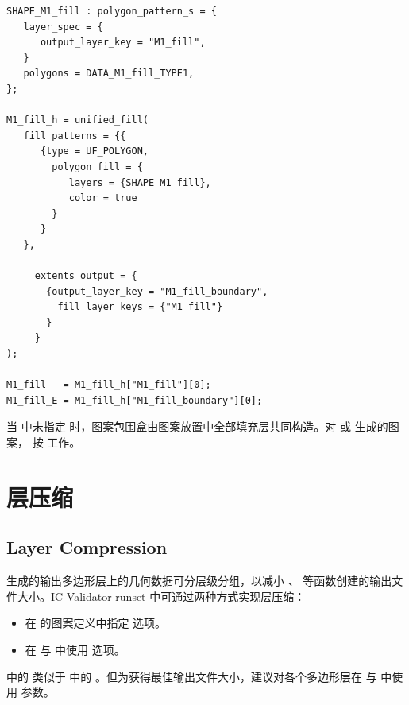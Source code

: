 \begin{lstlisting}[style=pxl,caption={使用 extents\_output 选项},label={ex:uf-extents}]
SHAPE_M1_fill : polygon_pattern_s = {
   layer_spec = {
      output_layer_key = "M1_fill",
   }
   polygons = DATA_M1_fill_TYPE1,
};

M1_fill_h = unified_fill(
   fill_patterns = {{
      {type = UF_POLYGON,
        polygon_fill = {
           layers = {SHAPE_M1_fill},
           color = true
        }
      }
   },

     extents_output = {
       {output_layer_key = "M1_fill_boundary",
         fill_layer_keys = {"M1_fill"}
       }
     }
);

M1_fill   = M1_fill_h["M1_fill"][0];
M1_fill_E = M1_fill_h["M1_fill_boundary"][0];
\end{lstlisting}


当  中未指定  时，图案包围盒由图案放置中全部填充层共同构造。对  或  生成的图案， 按  工作。

\section{层压缩}
\subsection*{Layer Compression}

 生成的输出多边形层上的几何数据可分层级分组，以减小 、 等函数创建的输出文件大小。IC Validator runset 中可通过两种方式实现层压缩：
\begin{itemize}
  \item 在  的图案定义中指定  选项。
  \item 在  与  中使用  选项。
\end{itemize}
 中的  类似于  中的 。但为获得最佳输出文件大小，建议对各个多边形层在  与  中使用  参数。
